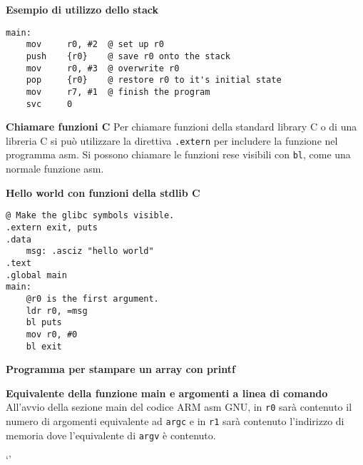 \begin{exmp}
\textbf{Esempio di utilizzo dello stack}
\begin{lstlisting}[style=armn]
main:
	mov 	r0, #2  @ set up r0
	push	{r0}    @ save r0 onto the stack
	mov 	r0, #3  @ overwrite r0
	pop 	{r0}    @ restore r0 to it's initial state
	mov	    r7, #1  @ finish the program
	svc		0
\end{lstlisting}
\end{exmp}

\begin{exmp}
\textbf{Chiamare funzioni C}
Per chiamare funzioni della standard library C o di una libreria C si può utilizzare la direttiva
\texttt{.extern} per includere la funzione nel programma asm. Si possono chiamare
le funzioni rese visibili con \texttt{bl}, come una normale funzione asm.
\end{exmp}

\begin{exmp}
\textbf{Hello world con funzioni della stdlib C}
\begin{lstlisting}[style=armn]
@ Make the glibc symbols visible.
.extern exit, puts
.data
	msg: .asciz "hello world"
.text
.global main
main:
	@r0 is the first argument.
	ldr r0, =msg
	bl puts
	mov r0, #0
	bl exit
\end{lstlisting}
\end{exmp}

\begin{exmp}
\textbf{Programma per stampare un array con printf}
\end{exmp}

\begin{exmp}
	\textbf{Equivalente della funzione main e argomenti a linea di comando}
	All'avvio della sezione main del codice ARM asm GNU, in
	\texttt{r0} sarà contenuto il numero di argomenti equivalente ad \texttt{argc}
	e in \texttt{r1} sarà contenuto l'indirizzo di memoria dove l'equivalente di \texttt{argv} è contenuto.
\end{exmp}
`'

